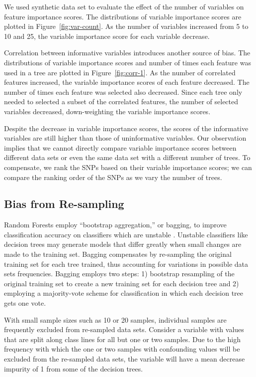 We used synthetic data set to evaluate the effect of the number of variables on feature importance scores. The distributions of variable importance scores are plotted in Figure~\ref{fig:var-count}.  As the number of variables increased from 5 to 10 and 25, the variable importance score for each variable decrease.

Correlation between informative variables introduces another source of bias. The distributions of variable importance scores and number of times each feature was used in a tree are plotted in Figure~\ref{fig:corr-1}.  As the number of correlated features increased, the variable importance scores of each feature decreased.  The number of times each feature was selected also decreased.  Since each tree only needed to selected a subset of the correlated features, the number of selected variables decreased, down-weighting the variable importance scores.

Despite the decrease in variable importance scores, the scores of the informative variables are still higher than those of uninformative variables.  Our observation implies that we cannot directly compare variable importance scores between different data sets or even the same data set with a different number of trees.  To compensate, we rank the SNPs based on their variable importance scores; we can compare the ranking order of the SNPs as we vary the number of trees.

\subsection{Bias from Re-sampling} \label{sec:resampling}
Random Forests employ ``bootstrap aggregation,'' or bagging, to improve classification accuracy on classifiers which are unstable \cite{Breiman1996}.  Unstable classifiers like decision trees may generate models that differ greatly when small changes are made to the training set.  Bagging compensates by re-sampling the original training set for each tree trained, thus accounting for variations in possible data sets frequencies.  Bagging employs two steps: 1) bootstrap resampling of the original training set to create a new training set for each decision tree and 2) employing a majority-vote scheme for classification in which each decision tree gets one vote.

With small sample sizes such as 10 or 20 samples, individual samples are frequently excluded from re-sampled data sets.  Consider a variable with values that are split along class lines for all but one or two samples. Due to the high frequency with which the one or two samples with confounding values will be excluded from the re-sampled data sets, the variable will have a mean decrease impurity of 1 from some of the decision trees. 

